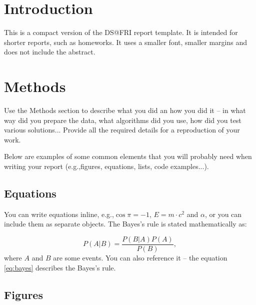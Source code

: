 \documentclass[fleqn,oneauthor,9pt]{ds_report}
\begin{document}
\flushbottom

\maketitle



\section*{Introduction}
This is a compact version of the DS@FRI report template. It is intended for shorter reports, such as homeworks. It uses a smaller font, smaller margins and does not include the abstract.



\section*{Methods}

Use the Methods section to describe what you did an how you did it -- in what way did you prepare the data, what algorithms did you use, how did you test various solutions... Provide all the required details for a reproduction of your work.

Below are examples of some common elements that you will probably need when writing your report (e.g.,figures, equations, lists, code examples...).


\subsection*{Equations}

You can write equations inline, e.g.,$\cos\pi=-1$, $E = m \cdot c^2$ and $\alpha$, or you can include them as separate objects. The Bayes’s rule is stated mathematically as:

\begin{equation}
  P(A|B) = \frac{P(B|A)P(A)}{P(B)},
  \label{eq:bayes}
\end{equation}
where $A$ and $B$ are some events. You can also reference it -- the equation \ref{eq:bayes} describes the Bayes's rule.

\subsection*{Figures}
\end{document}
